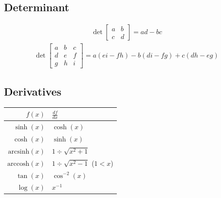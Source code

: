 \subsection{Determinant}

\begin{align*}
	\det
	\begin{bmatrix}
		a & b \\
		c & d
	\end{bmatrix}
	=
	ad-bc
\end{align*}
\begin{align*}
	\det
	\begin{bmatrix}
		a & b & c \\
		d & e & f \\
		g & h & i
	\end{bmatrix}
	=
	a(ei-fh)-b(di-fg)+c(dh-eg)
\end{align*}


\subsection{Derivatives}
\begin{tabular}{r|l}
    $f(x)$                & $\frac{df}{dx}$                 \\
    \hline
    $\sinh(x)$            & $\cosh(x)$                      \\
    $\cosh(x)$            & $\sinh(x)$                      \\
    $\mathrm{arcsinh}(x)$ & $1 \div \sqrt{x^2+1}$           \\
    $\mathrm{arccosh}(x)$ & $1 \div \sqrt{x^2 - 1}$ ($1<x$) \\
    $\tan(x)$             & $\cos^{-2}(x)$                  \\
    $\log(x)$             & $x^{-1}$
\end{tabular}

